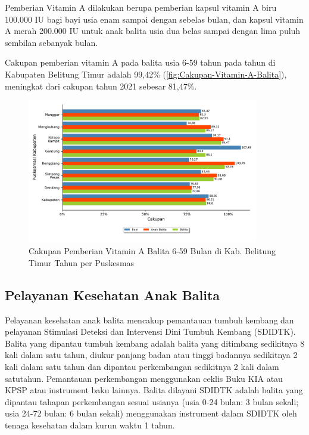 Pemberian Vitamin A dilakukan berupa pemberian kapsul vitamin A biru 100.000 IU bagi bayi
usia enam sampai dengan sebelas bulan, dan kapsul vitamin A merah 200.000
IU untuk anak balita usia dua belas sampai dengan lima puluh sembilan sebanyak
bulan.

Cakupan pemberian vitamin A pada balita usia 6-59 tahun pada tahun \tP di Kabupaten Belitung Timur adalah 99,42\% (\autoref{fig:Cakupan-Vitamin-A-Balita}), meningkat dari cakupan tahun 2021 sebesar 81,47\%.

\begin{figure}[H]
    \centering
    \includegraphics[width=0.9\textwidth]{bab_05/bab_05_22_bayiBalitaVitA}
    \caption{Cakupan Pemberian Vitamin A Balita 6-59 Bulan di Kab. Belitung Timur Tahun \tP per Puskesmas}
    \label{fig:Cakupan-Vitamin-A-Balita}
\end{figure}


\subsection{Pelayanan Kesehatan Anak Balita}
Pelayanan kesehatan anak balita mencakup pemantauan tumbuh kembang dan pelayanan Stimulasi Deteksi dan Intervensi Dini Tumbuh Kembang (SDIDTK).
Balita yang dipantau tumbuh kembang adalah  balita yang ditimbang sedikitnya 8 kali dalam satu tahun, diukur panjang badan atau tinggi badannya sedikitnya 2 kali dalam satu tahun dan dipantau perkembangan sedikitnya 2 kali dalam satutahun. Pemantauan perkembangan menggunakan ceklis Buku KIA atau KPSP atau instrument baku lainnya.
Balita dilayani SDIDTK adalah balita yang dipantau tahapan perkembangan sesuai usianya (usia 0-24 bulan: 3 bulan sekali; usia 24-72 bulan: 6 bulan sekali) menggunakan instrument dalam SDIDTK oleh tenaga kesehatan dalam kurun waktu 1 tahun.

